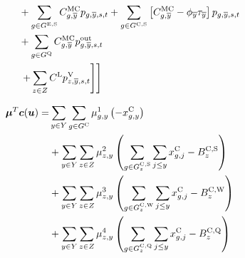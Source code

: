 \documentclass{article}
\begin{document}
\begin{alignat}{3}
	& && && + \sum\limits_{\iGenerator \in \sGeneratorsExistingSolar} \cMarginalCost[\iGenerator,\iYearTerminal] \vPower[\iGenerator,\iYearTerminal,\iScenario,\iInterval] + \sum\limits_{\iGenerator \in \sGeneratorsCandidateSolar} \left[\cMarginalCost[\iGenerator,\iYearTerminal] - \vBaseline[\iYearTerminal]\vPermitPrice[\iYearTerminal]\right] \vPower[\iGenerator,\iYearTerminal,\iScenario,\iInterval]\nonumber\\
	& && && + \sum\limits_{\iGenerator \in \sStorage} \cMarginalCost[\iGenerator,\iYearTerminal] \vPowerOut[\iGenerator,\iYearTerminal,\iScenario,\iInterval] \nonumber\\
	& && && \left.\left. + \sum\limits_{\iZone \in \sZones} \cLostLoadCost \vLostLoadPower[\iZone,\iYearTerminal,\iScenario,\iInterval] \right]\right] \nonumber\\
\end{alignat}

\begin{align}
\begin{split}
\bm{\mu}^{T}\bm{c}(\bm{u}) = & \sum\limits_{\iYear \in \sYears} \sum\limits_{\iGenerator \in \sGeneratorsCandidate} \dNonNegativeCandidateCapacity \left(-\vInstalledCapacity\right)\\
& + \sum\limits_{\iYear \in \sYears}\sum\limits_{\iZone \in \sZones} \dSolarBuildLimit \left(\sum\limits_{\iGenerator \in \sGeneratorsCandidateSolar_{\iZone}} \sum\limits_{\iYearAlias \leq \iYear} \vInstalledCapacity[\iGenerator,\iYearAlias]  - \cBuildLimitSolar\right)\\
& + \sum\limits_{\iYear \in \sYears}\sum\limits_{\iZone \in \sZones} \dWindBuildLimit \left(\sum\limits_{\iGenerator \in \sGeneratorsCandidateWind_{\iZone}} \sum\limits_{\iYearAlias \leq \iYear} \vInstalledCapacity[\iGenerator,\iYearAlias] - \cBuildLimitWind\right)\\
& + \sum\limits_{\iYear \in \sYears}\sum\limits_{\iZone \in \sZones} \dStorageBuildLimit \left(\sum\limits_{\iGenerator \in \sStorageCandidate_{\iZone}} \sum\limits_{\iYearAlias \leq \iYear} \vInstalledCapacity[\iGenerator,\iYearAlias] - \cBuildLimitStorage\right)\\
\end{split}
\end{align}

\end{document}
